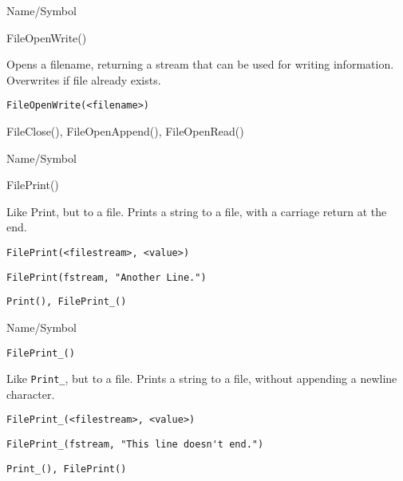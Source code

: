 \rl


\begin{desc}{Name/Symbol}
\item[Name/Symbol]	FileOpenWrite()

\item[Description]	Opens a filename, returning a stream  that can be used for writing information.  Overwrites if file already exists.

\item[Usage]
\begin{verbatim}
FileOpenWrite(<filename>)
\end{verbatim}

\item[Example]	

\item[See Also]	FileClose(), FileOpenAppend(), FileOpenRead()
\end{desc}

\rl




\begin{desc}{Name/Symbol}
\item[Name/Symbol]	FilePrint()

\item[Description]	Like Print, but to a file.  Prints a string to a file, 
		with a carriage return at the end.
	
\item[Usage]
\begin{verbatim}
FilePrint(<filestream>, <value>)
\end{verbatim}

\item[Example]
\begin{verbatim}
FilePrint(fstream, "Another Line.")
\end{verbatim}

\item[See Also]	\verb+Print(), FilePrint_()+
\end{desc}

\rl




\begin{desc}{Name/Symbol}
\item[Name/Symbol]	\verb+FilePrint_()+

\item[Description]	Like \verb+Print_+, but to a file.  Prints a string to a file,	without appending a newline character.
	
\item[Usage]
\begin{verbatim}
FilePrint_(<filestream>, <value>)
\end{verbatim}

\item[Example]
\begin{verbatim}
FilePrint_(fstream, "This line doesn't end.")
\end{verbatim}

\item[See Also]	\verb+Print_(), FilePrint()+
\end{desc}

